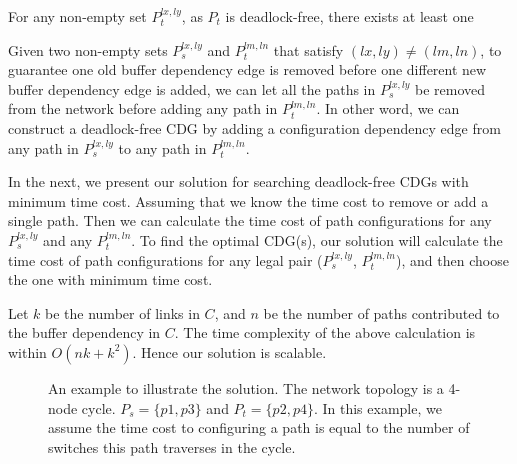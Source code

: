 For any non-empty set $P_t^{lx,ly}$, as $P_t$ is deadlock-free, there exists at least one 

Given two non-empty sets $P_s^{lx,ly}$ and $P_t^{lm,ln}$ that satisfy $(lx, ly) \neq (lm, ln)$, to guarantee one old buffer dependency edge is removed before one different new buffer dependency edge is added, we can let all the paths in $P_s^{lx,ly}$ be removed from the network before adding any path in $P_t^{lm,ln}$. In other word, we can construct a deadlock-free CDG by adding a configuration dependency edge from any path in $P_s^{lx,ly}$ to any path in $P_t^{lm,ln}$.

In the next, we present our solution for searching deadlock-free CDGs with minimum time cost.  Assuming that we know the time cost to remove or add a single path. Then we can calculate the time cost of path configurations for any $P_s^{lx,ly}$ and any $P_t^{lm,ln}$. To find the optimal CDG(s), our solution will calculate the time cost of path configurations for any legal pair ($P_s^{lx,ly}$, $P_t^{lm,ln}$), and then choose the one with minimum time cost. 

Let $k$ be the number of links in $C$, and $n$ be the number of paths contributed to the buffer dependency in $C$. The time complexity of the above calculation is within $O(nk + k^2)$. Hence our solution is scalable.

\begin{figure}[t]
	\centering
	
	
	
	\caption{An example to illustrate the solution. The network topology is a 4-node cycle. $P_s=\{p1, p3\}$ and $P_t=\{p2, p4\}$. In this example, we assume the time cost to configuring a path is equal to the number of switches this path traverses in the cycle.}\label{fig:solution_example1}
	
\end{figure}

